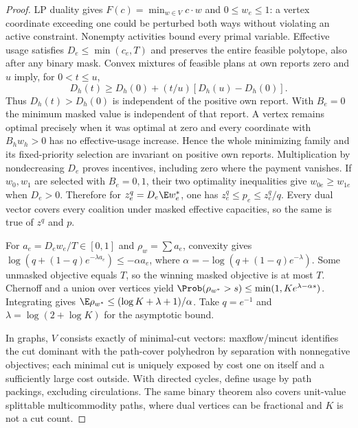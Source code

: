 \begin{proof}
LP duality gives $F(c)=\min_{w\in V}c\cdot w$ and $0\le w_e\le1$:
a vertex coordinate exceeding one could be perturbed both ways without
violating an active constraint. Nonempty activities bound every primal
variable. Effective usage satisfies $D_e\le\min(c_e,T)$ and preserves
the entire feasible polytope, also after any binary mask. Convex mixtures
of feasible plans at own reports zero and $u$ imply, for $0<t\le u$,
\[
 D_h(t)\ge D_h(0)+(t/u)[D_h(u)-D_h(0)].
\]
Thus $D_h(t)>D_h(0)$ is independent of the positive own report. With $B_e=0$
the minimum masked value is independent of that report. A vertex remains
optimal precisely when it was optimal at zero and every coordinate with
$B_hw_h>0$ has no effective-usage increase. Hence the whole minimizing
family and its fixed-priority selection are invariant on positive own
reports. Multiplication by nondecreasing $D_e$ proves incentives, including
zero where the payment vanishes.
If $w_0,w_1$ are selected with $B_e=0,1$, their two optimality inequalities
give $w_{0e}\ge w_{1e}$ when $D_e>0$. Therefore for
$z_e^q=D_e\E w_e^*$, one has $z_e^q\le p_e\le z_e^q/q$.
Every dual vector covers every coalition under masked effective capacities,
so the same is true of $z^q$ and $p$.

For $a_e=D_ew_e/T\in[0,1]$ and $\rho_w=\sum a_e$, convexity gives
$\log(q+(1-q)e^{-\lambda a_e})\le-\alpha a_e$, where
$\alpha=-\log(q+(1-q)e^{-\lambda})$. Some unmasked objective equals $T$,
so the winning masked objective is at most $T$. Chernoff and a union over
vertices yield $\Prob(\rho_{w^*}>s)\le\min(1,Ke^{\lambda-\alpha s})$.
Integrating gives $\E\rho_{w^*}\le(\log K+\lambda+1)/\alpha$.
Take $q=e^{-1}$ and $\lambda=\log(2+\log K)$ for the asymptotic bound.

In graphs, $V$ consists exactly of minimal-cut vectors: maxflow/mincut
identifies the cut dominant with the path-cover polyhedron by separation
with nonnegative objectives; each minimal cut is uniquely exposed by
cost one on itself and a sufficiently large cost outside. With directed
cycles, define usage by path packings, excluding circulations. The same
binary theorem also covers unit-value splittable multicommodity paths,
where dual vertices can be fractional and $K$ is not a cut count.


\end{proof}
